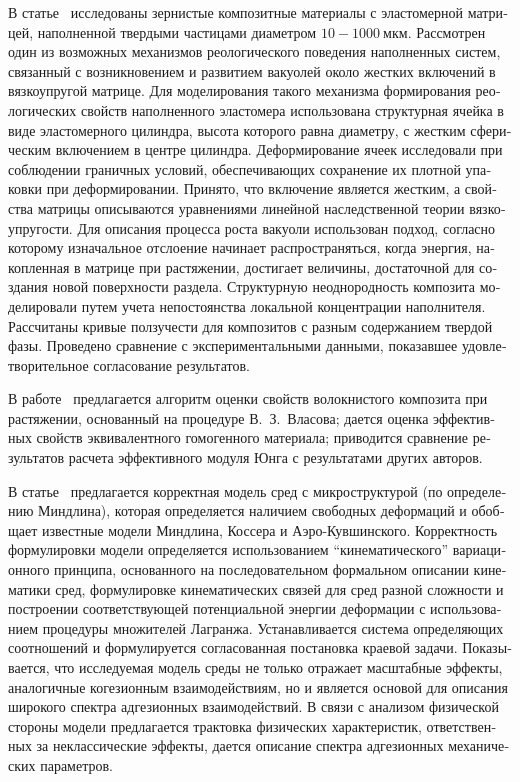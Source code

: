 \begin{russian}
В статье~\cite{Golotina} исследованы зернистые композитные материалы с эластомерной матрицей, наполненной твердыми частицами диаметром $10-1000~\text{мкм}$. Рассмотрен один из возможных механизмов реологического поведения наполненных систем, связанный с возникновением и развитием вакуолей около жестких включений в вязкоупругой матрице. Для моделирования такого механизма формирования реологических свойств наполненного эластомера использована структурная ячейка в виде эластомерного цилиндра, высота которого равна диаметру, с жестким сферическим включением в центре цилиндра. Деформирование ячеек исследовали при соблюдении граничных условий, обеспечивающих сохранение их плотной упаковки при деформировании. Принято, что включение является жестким, а свойства матрицы описываются уравнениями линейной наследственной теории вязкоупругости. Для описания процесса роста вакуоли использован подход, согласно которому изначальное отслоение начинает распространяться, когда энергия, накопленная в матрице при растяжении, достигает величины, достаточной для создания новой поверхности раздела. Структурную неоднородность композита моделировали путем учета непостоянства локальной концентрации наполнителя. Рассчитаны кривые ползучести для композитов с разным содержанием твердой фазы. Проведено сравнение с экспериментальными данными, показавшее удовлетворительное согласование результатов.{\sloppy\par}

В работе~\cite{Gordeev} предлагается алгоритм оценки свойств волокнистого композита при растяжении, основанный на процедуре В.~З.~Власова; дается оценка эффективных свойств эквивалентного гомогенного материала; приводится сравнение результатов расчета эффективного модуля Юнга с результатами других авторов.

В статье~\cite{Belov} предлагается корректная модель сред с микроструктурой (по определению Миндлина), которая определяется наличием свободных деформаций и обобщает известные модели Миндлина, Коссера и Аэро-Кувшинского. Корректность формулировки модели определяется использованием ``кинематического'' вариационного принципа, основанного на последовательном формальном описании кинематики сред, формулировке кинематических связей для сред разной сложности и построении соответствующей потенциальной энергии деформации с использованием процедуры множителей Лагранжа. Ус\-та\-нав\-ли\-ва\-ет\-ся система определяющих соотношений и формулируется согласованная постановка краевой задачи. Показывается, что исследуемая модель среды не только отражает масштабные эффекты, аналогичные когезионным взаимодействиям, но и является основой для описания широкого спектра адгезионных взаимодействий. В связи с анализом физической стороны модели предлагается трактовка физических характеристик, ответственных за неклассические эффекты, дается описание спектра адгезионных механических параметров.


\end{russian}
